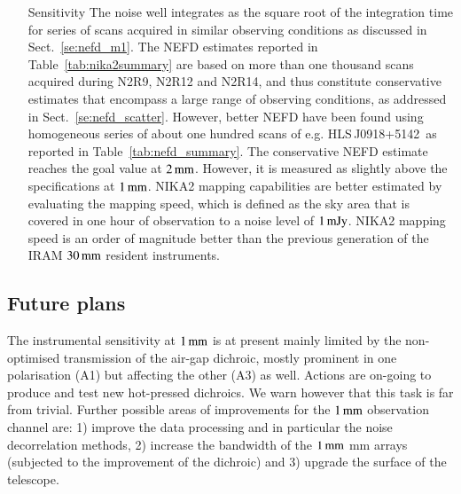 \documentclass{aa}
\newcommand{\hls}{HLS\,J0918+5142}
\begin{document}
\begin{enumerate}
\item[Sensitivity] The noise well integrates as the square root of the integration time
  for series of scans acquired in similar observing conditions as
  discussed in Sect.~\ref{se:nefd_m1}. The NEFD estimates reported in
  Table~\ref{tab:nika2summary} are based on more than one thousand scans
  acquired during N2R9, N2R12 and N2R14, and thus constitute
  conservative estimates that encompass a large range of observing
  conditions, as addressed in Sect.~\ref{se:nefd_scatter}. However,
  better NEFD have been found using homogeneous series of about one
  hundred scans of e.g. \hls\, as reported in
  Table~\ref{tab:nefd_summary}.  The conservative NEFD estimate reaches
  the goal value at $2\,\rm{mm}$. However, it is measured as slightly
  above the specifications at $1\,\rm{mm}$.
  NIKA2 mapping capabilities are better estimated by evaluating the
  mapping speed, which is defined as the sky area that is covered in one
  hour of observation to a noise level of $1\,\rm{mJy}$. NIKA2 mapping
  speed is an order of magnitude better than the previous generation of
  the IRAM $30\,\rm{mm}$ resident instruments. 
\end{enumerate}

\subsection*{Future plans}
The instrumental sensitivity at $1\,\rm{mm}$ is at present mainly
limited by the non-optimised transmission of the air-gap dichroic,
mostly prominent in one polarisation (A1) but affecting the other
(A3) as well. Actions are on-going to produce and test new
hot-pressed dichroics. We warn however that this task is far from
trivial.
Further possible areas of improvements for the $1\,\rm{mm}$
observation channel are: 1) improve the data processing and in
particular the noise decorrelation methods, 2) increase the
bandwidth of the $1\,\rm{mm}$ mm arrays (subjected to the
improvement of the dichroic) and 3) upgrade the surface of the
telescope.
  
\end{document}
